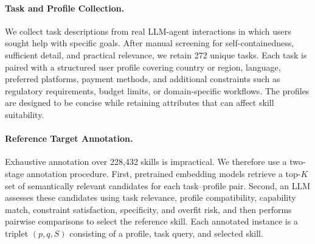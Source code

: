 \documentclass[letterpaper]{article} %
\begin{document}
\paragraph{Task and Profile Collection.}
We collect task descriptions from real LLM-agent interactions in which users sought help with specific goals. After manual screening for self-containedness, sufficient detail, and practical relevance, we retain 272 unique tasks. Each task is paired with a structured user profile covering country or region, language, preferred platforms, payment methods, and additional constraints such as regulatory requirements, budget limits, or domain-specific workflows. The profiles are designed to be concise while retaining attributes that can affect skill suitability.


\paragraph{Reference Target Annotation.}
\label{para:gt annotation}
Exhaustive annotation over 228,432 skills is impractical. We therefore use a two-stage annotation procedure. First, pretrained embedding models retrieve a top-$K$ set of semantically relevant candidates for each task--profile pair. Second, an LLM assesses these candidates using task relevance, profile compatibility, capability match, constraint satisfaction, specificity, and overfit risk, and then performs pairwise comparisons to select the reference skill. Each annotated instance is a triplet $(p,q,S)$ consisting of a profile, task query, and selected skill.

\end{document}
